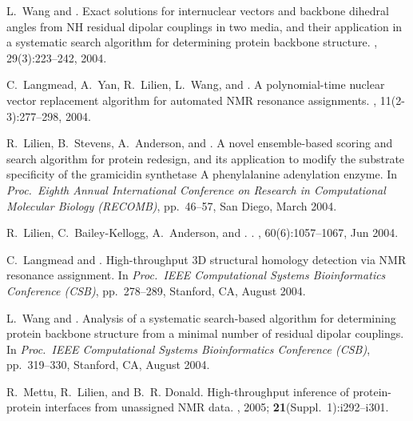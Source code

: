 \documentclass[11pt]{nih}
\begin{document}
\begin{Enumerate}
L.~Wang and {\brd}.
\newblock Exact solutions for internuclear vectors and backbone dihedral angles
  from {NH} residual dipolar couplings in two media, and their application in a
  systematic search algorithm for determining protein backbone structure.
, 29(3):223--242, 2004.

C.~Langmead, A.~Yan, R.~Lilien, L.~Wang, and {\brd}.
\newblock A polynomial-time nuclear vector replacement algorithm for automated
  {NMR} resonance assignments.
, 11(2-3):277--298, 2004.

R.~Lilien, B.~Stevens, A.~Anderson, and {\brd}.
\newblock A novel ensemble-based scoring and search algorithm for protein
  redesign, and its application to modify the substrate specificity of the
  gramicidin synthetase {A} phenylalanine adenylation enzyme.
\newblock In {\em Proc.~Eighth Annual International Conference on
  Research in Computational Molecular Biology ({RECOMB})}, pp.~46--57, San
  Diego, March 2004.

R.~Lilien, C.~Bailey-Kellogg, A.~Anderson, and {\brd}.
.
,
  60(6):1057--1067, Jun 2004.

C.~Langmead and {\brd}.
\newblock High-throughput 3{D} structural homology detection via {NMR}
  resonance assignment.
\newblock In {\em Proc.~{IEEE} Computational Systems
  Bioinformatics Conference ({CSB})}, pp.~278--289, Stanford, CA, August
  2004.


L.~Wang and {\brd}.
\newblock Analysis of a systematic search-based algorithm for determining
  protein backbone structure from a minimal number of residual dipolar
  couplings.
\newblock In {\em Proc.~{IEEE} Computational Systems
  Bioinformatics Conference ({CSB})}, pp.~319--330, Stanford, CA, August
  2004.

R.~Mettu, R.~Lilien, and B.~R. Donald.
\newblock High-throughput inference of protein-protein interfaces from
  unassigned {NMR} data.
, 2005; {\bf{21}}(Suppl.~1):i292--i301.   


\end{Enumerate}
\end{document}
